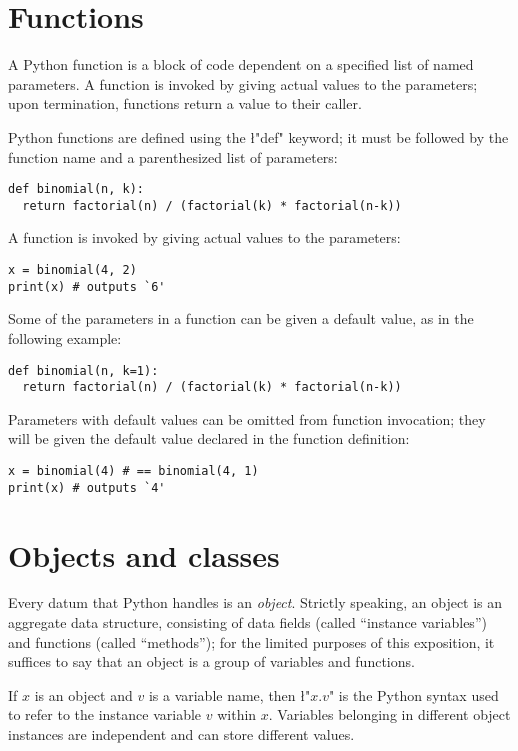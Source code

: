\section{Functions}
\label{sec:functions}

A Python function is a block of code dependent on a specified list of
named parameters.  A function is invoked by giving actual values to
the parameters; upon termination, functions return a value to their
caller. 

Python functions are defined using the \l"def" keyword; it must be
followed by the function name and a parenthesized list of parameters:
\begin{lstlisting}
def binomial(n, k):
  return factorial(n) / (factorial(k) * factorial(n-k))
\end{lstlisting}
A function is invoked by giving actual values to the parameters:
\begin{lstlisting}
x = binomial(4, 2)
print(x) # outputs `6'
\end{lstlisting}

Some of the parameters in a function can be given a default value, as
in the following example:
\begin{lstlisting}
def binomial(n, k=1):
  return factorial(n) / (factorial(k) * factorial(n-k))
\end{lstlisting}
Parameters with default values can be omitted from function
invocation; they will be given the default value declared in the
function definition:
\begin{lstlisting}
x = binomial(4) # == binomial(4, 1)
print(x) # outputs `4'
\end{lstlisting}


\section{Objects and classes}
\label{sec:objects}

Every datum that Python handles is an \emph{object}.  Strictly
speaking, an object is an aggregate data structure, consisting of data
fields (called ``instance variables'') and functions (called
``methods''); for the limited purposes of this exposition, it suffices
to say that an object is a group of variables and functions.

If $x$ is an object and $v$ is a variable name, then \l"$x$.$v$" is
the Python syntax used to refer to the instance variable $v$ within
$x$. Variables belonging in different object instances are independent
and can store different values.

